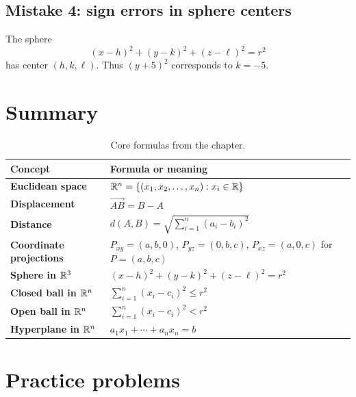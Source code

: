 \subsection*{Mistake 4: sign errors in sphere centers}

The sphere
\[
  (x-h)^2+(y-k)^2+(z-\ell)^2=r^2
\]
has center $(h,k,\ell)$. Thus $(y+5)^2$ corresponds to $k=-5$.

\section{Summary}

\begin{table}[H]
\centering
\renewcommand{\arraystretch}{1.35}
\begin{tabularx}{\textwidth}{>{\bfseries}p{}X}
\toprule
Concept & Formula or meaning \\
\midrule
Euclidean space & $\mathbb{R}^n=\{(x_1,x_2,\ldots,x_n):x_i\in\mathbb{R}\}$ \\
Displacement & $\overrightarrow{AB}=B-A$ \\
Distance & $d(A,B)=\sqrt{\sum_{i=1}^n(a_i-b_i)^2}$ \\
Coordinate projections & $P_{xy}=(a,b,0)$, $P_{yz}=(0,b,c)$, $P_{xz}=(a,0,c)$ for $P=(a,b,c)$ \\
Sphere in $\mathbb{R}^3$ & $(x-h)^2+(y-k)^2+(z-\ell)^2=r^2$ \\
Closed ball in $\mathbb{R}^n$ & $\sum_{i=1}^n(x_i-c_i)^2\le r^2$ \\
Open ball in $\mathbb{R}^n$ & $\sum_{i=1}^n(x_i-c_i)^2< r^2$ \\
Hyperplane in $\mathbb{R}^n$ & $a_1x_1+\cdots+a_nx_n=b$ \\
\bottomrule
\end{tabularx}
\caption{Core formulas from the chapter.}
\label{tab:chapter-two-summary}
\end{table}

\section*{Practice problems}

